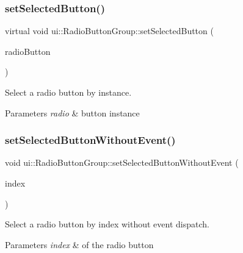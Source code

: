 \subsubsection{\texorpdfstring{set\+Selected\+Button()}{setSelectedButton()}\hspace{0.1cm}{\footnotesize\ttfamily [4/4]}}
{\footnotesize\ttfamily virtual void ui\+::\+Radio\+Button\+Group\+::set\+Selected\+Button (\begin{DoxyParamCaption}\item[{\hyperlink{classui_1_1RadioButton}{Radio\+Button} $\ast$}]{radio\+Button }\end{DoxyParamCaption})\hspace{0.3cm}{\ttfamily [virtual]}}

Select a radio button by instance.


\begin{DoxyParams}{Parameters}
{\em radio} & button instance \\
\hline
\end{DoxyParams}
\mbox{\label{classui_1_1RadioButtonGroup_a27e6a20a27f2199ec0b9663bc2261950}} 
\subsubsection{\texorpdfstring{set\+Selected\+Button\+Without\+Event()}{setSelectedButtonWithoutEvent()}\hspace{0.1cm}{\footnotesize\ttfamily [1/4]}}
{\footnotesize\ttfamily void ui\+::\+Radio\+Button\+Group\+::set\+Selected\+Button\+Without\+Event (\begin{DoxyParamCaption}\item[{int}]{index }\end{DoxyParamCaption})\hspace{0.3cm}{\ttfamily [virtual]}}

Select a radio button by index without event dispatch.


\begin{DoxyParams}{Parameters}
{\em index} & of the radio button \\
\hline
\end{DoxyParams}
\mbox{\label{classui_1_1RadioButtonGroup_a3104bb14ad606a26338edde6f8cb89a7}} 
